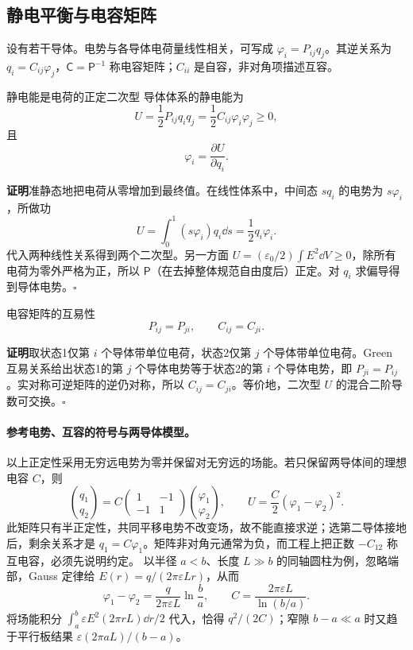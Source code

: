 \subsection{静电平衡与电容矩阵}

设有若干导体。电势与各导体电荷量线性相关，可写成
$\varphi_i=P_{ij}q_j$。其逆关系为
$q_i=C_{ij}\varphi_j$，$\mathsf C=\mathsf P^{-1}$ 称电容矩阵；$C_{ii}$ 是自容，非对角项描述互容。

\begin{advtheorem}{静电能是电荷的正定二次型}\label{advA4:thm:capacitance-energy}
导体体系的静电能为
\[
 \boxed{U=\frac12P_{ij}q_iq_j
 =\frac12C_{ij}\varphi_i\varphi_j\ge0},
\]
且
\[
 \varphi_i=\frac{\partial U}{\partial q_i}.
\]
\end{advtheorem}
\noindent\textbf{证明}\quad 准静态地把电荷从零增加到最终值。在线性体系中，中间态 $sq_i$ 的电势为 $s\varphi_i$，所做功
\[
 U=\int_0^1(s\varphi_i)q_i\dd s=\frac12q_i\varphi_i.
\]
代入两种线性关系得到两个二次型。另一方面
$U=(\varepsilon_0/2)\int E^2\dd V\ge0$，除所有电荷为零外严格为正，所以 $\mathsf P$（在去掉整体规范自由度后）正定。对 $q_i$ 求偏导得到导体电势。\hfill$\square$

\begin{advtheorem}{电容矩阵的互易性}\label{advA4:thm:capacitance-reciprocity}
\[
 \boxed{P_{ij}=P_{ji},\qquad C_{ij}=C_{ji}}.
\]
\end{advtheorem}
\noindent\textbf{证明}\quad 取状态1仅第 $i$ 个导体带单位电荷，状态2仅第 $j$ 个导体带单位电荷。Green 互易关系给出状态1的第 $j$ 个导体电势等于状态2的第 $i$ 个导体电势，即
$P_{ji}=P_{ij}$。实对称可逆矩阵的逆仍对称，所以
$C_{ij}=C_{ji}$。等价地，二次型 $U$ 的混合二阶导数可交换。\hfill$\square$


\paragraph{参考电势、互容的符号与两导体模型。}
以上正定性采用无穷远电势为零并保留对无穷远的场能。若只保留两导体间的理想电容 $C$，则
\[
 \binom{q_1}{q_2}=C\begin{pmatrix}1&-1\\-1&1\end{pmatrix}
 \binom{\varphi_1}{\varphi_2},\qquad
 U=\frac C2(\varphi_1-\varphi_2)^2.
\]
此矩阵只有半正定性，共同平移电势不改变场，故不能直接求逆；选第二导体接地后，剩余关系才是 $q_1=C\varphi_1$。矩阵非对角元通常为负，而工程上把正数 $-C_{12}$ 称互电容，必须先说明约定。
以半径 $a<b$、长度 $L\gg b$ 的同轴圆柱为例，忽略端部，Gauss 定律给 $E(r)=q/(2\pi\varepsilon Lr)$，从而
\[
 \varphi_1-\varphi_2=\frac q{2\pi\varepsilon L}\ln\frac ba,
 \qquad C=\frac{2\pi\varepsilon L}{\ln(b/a)}.
\]
将场能积分 $\int_a^b\varepsilon E^2(2\pi rL)\dd r/2$ 代入，恰得 $q^2/(2C)$；窄隙 $b-a\ll a$ 时又趋于平行板结果 $\varepsilon(2\pi aL)/(b-a)$。
